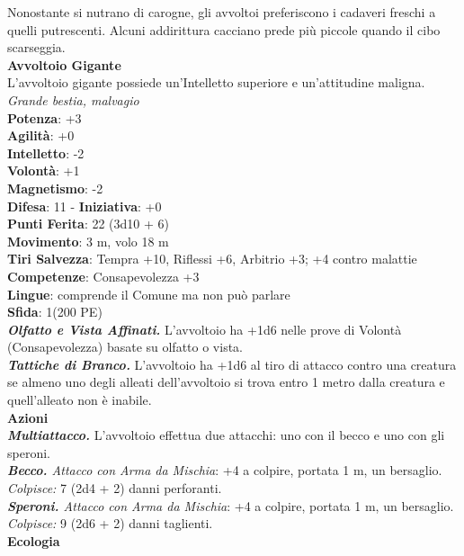 \begin{multicols}{2}
Nonostante si nutrano di carogne, gli avvoltoi preferiscono i cadaveri freschi a quelli putrescenti. Alcuni addirittura cacciano prede più piccole quando il cibo scarseggia.\\

\medskip\textbf{Avvoltoio Gigante}\\
L'avvoltoio gigante possiede un'Intelletto superiore e un'attitudine maligna.\\
\emph{Grande bestia, malvagio}\\
\textbf{Potenza}: +3\\
\textbf{Agilità}: +0\\
\textbf{Intelletto}: -2\\
\textbf{Volontà}: +1\\
\textbf{Magnetismo}: -2\\
\textbf{Difesa}: 11 - \textbf{Iniziativa}: +0\\
\textbf{Punti Ferita}: 22 (3d10 + 6)\\
\textbf{Movimento}: 3 m, volo 18 m\\
\textbf{Tiri Salvezza}: Tempra +10, Riflessi +6, Arbitrio +3; +4 contro malattie\\
\textbf{Competenze}: Consapevolezza +3\\
\textbf{Lingue}: comprende il Comune ma non può parlare\\
\textbf{Sfida}: 1(200 PE)\smallskip\\
\emph{\textbf{Olfatto e Vista Affinati.}} L'avvoltoio ha +1d6 nelle prove di Volontà (Consapevolezza) basate su olfatto o vista.\\
\emph{\textbf{Tattiche di Branco.}} L'avvoltoio ha +1d6 al tiro di attacco contro una creatura se almeno uno degli alleati dell'avvoltoio si trova entro 1 metro dalla creatura e quell'alleato non è inabile.\\
\smallskip\textbf{Azioni}\\
\emph{\textbf{Multiattacco.}} L'avvoltoio effettua due attacchi: uno con il becco e uno con gli speroni.\\
\emph{\textbf{Becco.} Attacco con Arma da Mischia}: +4 a colpire, portata 1 m, un bersaglio.\\
\emph{Colpisce:} 7 (2d4 + 2) danni perforanti.\\
\emph{\textbf{Speroni.} Attacco con Arma da Mischia}: +4 a colpire, portata 1 m, un bersaglio.\\
\emph{Colpisce:} 9 (2d6 + 2) danni taglienti.\\
\textbf{Ecologia}\\

\end{multicols}
